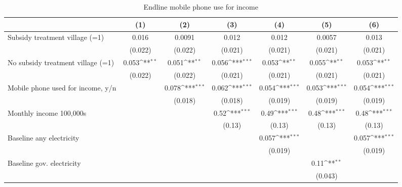 \begin{table}[htbp]\centering
\def\sym#1{\ifmmode^{#1}\else\(^{#1}\)\fi}
\caption{Endline mobile phone use for income}
\begin{tabular*}{1\hsize}{@{\hskip\tabcolsep\extracolsep\fill}l*{6}{c}}
\toprule
                &\multicolumn{1}{c}{(1)}         &\multicolumn{1}{c}{(2)}         &\multicolumn{1}{c}{(3)}         &\multicolumn{1}{c}{(4)}         &\multicolumn{1}{c}{(5)}         &\multicolumn{1}{c}{(6)}         \\
\midrule
Subsidy treatment village (=1)&    0.016         &   0.0091         &    0.012         &    0.012         &   0.0057         &    0.013         \\
                &  (0.022)         &  (0.022)         &  (0.021)         &  (0.021)         &  (0.021)         &  (0.021)         \\
No subsidy treatment village (=1)&    0.053\sym{**} &    0.051\sym{**} &    0.056\sym{***}&    0.053\sym{**} &    0.055\sym{**} &    0.053\sym{**} \\
                &  (0.022)         &  (0.022)         &  (0.021)         &  (0.021)         &  (0.021)         &  (0.021)         \\
Mobile phone used for income, y/n&                  &    0.078\sym{***}&    0.062\sym{***}&    0.054\sym{***}&    0.053\sym{***}&    0.054\sym{***}\\
                &                  &  (0.018)         &  (0.018)         &  (0.019)         &  (0.019)         &  (0.019)         \\
Monthly income 100,000s&                  &                  &     0.52\sym{***}&     0.49\sym{***}&     0.48\sym{***}&     0.48\sym{***}\\
                &                  &                  &   (0.13)         &   (0.13)         &   (0.13)         &   (0.13)         \\
Baseline any electricity&                  &                  &                  &    0.057\sym{***}&                  &    0.057\sym{***}\\
                &                  &                  &                  &  (0.019)         &                  &  (0.019)         \\
Baseline gov. electricity&                  &                  &                  &                  &     0.11\sym{**} &                  \\
                &                  &                  &                  &                  &  (0.043)         &                  \\

\end{tabular*}
\end{table}
